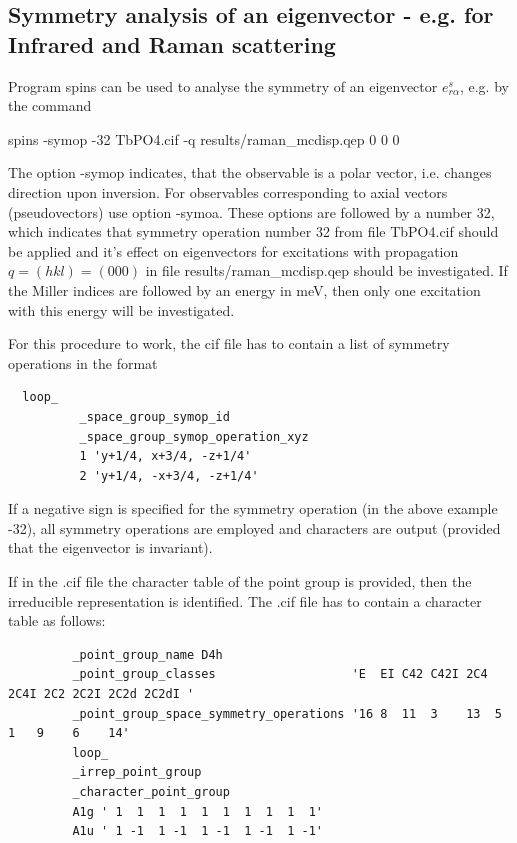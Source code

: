 \subsection{Symmetry analysis of an eigenvector - e.g. for Infrared and Raman scattering}
\label{symmetryofev}

Program {\prg spins} can be used to analyse the symmetry of an eigenvector 
$e^s_{r\alpha}$, e.g. by the command

{\prg spins -symop -32 TbPO4.cif  -q results/raman\_mcdisp.qep 0 0 0}

The option {\prg -symop} indicates, that the observable is a polar vector, i.e. changes
direction upon inversion. For observables corresponding to axial vectors (pseudovectors)
use option {\prg -symoa}. These options are followed by a number 32, which indicates
that symmetry operation number 32 from file TbPO4.cif should be applied and it's
effect on eigenvectors for excitations
with propagation $q=(hkl)=(0 0 0)$ in file results/raman\_mcdisp.qep should be investigated.
If the Miller indices are followed by an energy in meV, then only one excitation with 
this energy will be investigated. 

For this procedure to work, the cif file has to contain a list of symmetry operations
in the format
\begin{verbatim}
  loop_
          _space_group_symop_id
          _space_group_symop_operation_xyz
          1 'y+1/4, x+3/4, -z+1/4'
          2 'y+1/4, -x+3/4, -z+1/4'
\end{verbatim}

 If a negative sign is specified for the symmetry operation (in the above example -32), all symmetry operations
         are employed and characters are output (provided that the eigenvector is invariant).

         If in the .cif file the character table of the point group is provided, then 
         the irreducible representation is identified. The .cif file has to contain a character table
         as follows:
\begin{verbatim}
         _point_group_name D4h
         _point_group_classes                   'E  EI C42 C42I 2C4 2C4I 2C2 2C2I 2C2d 2C2dI '
         _point_group_space_symmetry_operations '16 8  11  3    13  5    1   9    6    14'
         loop_
         _irrep_point_group
         _character_point_group
         A1g ' 1  1  1  1  1  1  1  1  1  1'
         A1u ' 1 -1  1 -1  1 -1  1 -1  1 -1'
\end{verbatim}








